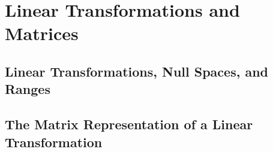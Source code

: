 \setcounter{chapter}{1}
\chapter{Linear Transformations and Matrices}


\section{Linear Transformations, Null Spaces, and Ranges}



\vspace{12pt}

\setcounter{Exercise}{5}


\vspace{12pt}

\setcounter{Exercise}{10}


\vspace{12pt}



\vspace{12pt}

\setcounter{Exercise}{19}


\vspace{12pt}

\setcounter{Exercise}{21}


\vspace{12pt}

\setcounter{Exercise}{23}


\vspace{12pt}

\setcounter{Exercise}{34}



\section{The Matrix Representation of a Linear Transformation}



\vspace{12pt}



\vspace{12pt}

\setcounter{Exercise}{5}


